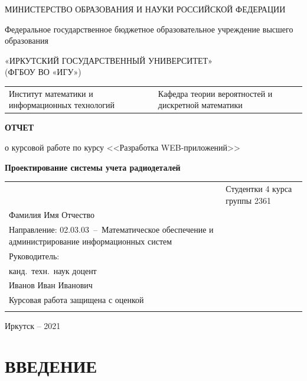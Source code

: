 \documentclass[12pt,final]{report}
\begin{document}
\thispagestyle{empty}
\begin{center}
МИНИСТЕРСТВО ОБРАЗОВАНИЯ И НАУКИ РОССИЙСКОЙ ФЕДЕРАЦИИ

Федеральное государственное бюджетное образовательное учреждение высшего образования

«ИРКУТСКИЙ  ГОСУДАРСТВЕННЫЙ УНИВЕРСИТЕТ»\\
(ФГБОУ ВО «ИГУ»)
\end{center}
\vfill %

\noindent\begin{tabularx}{\textwidth} {
  >{\raggedright\arraybackslash}X
  >{\raggedright\arraybackslash}X }
Институт математики и информационных технологий
&
Кафедра теории вероятностей и дискретной математики
\end{tabularx}

\vfill
\begin{center}
  \textbf{ОТЧЕТ}
\vspace{1em}

о курсовой работе по курсу <<Разработка WEB-приложений>>

{\bf Проектирование системы учета радиодеталей}

\end{center}
\vfill

\noindent\begin{tabularx}{\textwidth} {
  >{\raggedright\arraybackslash}X
  >{\raggedright}X }
&

Студентки 4 курса группы 2361\\
Фамилия Имя Отчество\\
Направление\;: 02.03.03~--~Математическое обеспечение и администрирование информационных систем\\[2em]

Руководитель:\\
канд.~техн.~наук доцент\\
Иванов Иван Иванович\\[2em]

Курсовая работа защищена с оценкой\\[1em] \underline{\hspace{3cm}}
\end{tabularx}
\vfill
\begin{center}
  Иркутск -- 2021
\end{center}
\clearpage

\tableofcontents

\chapter*{ВВЕДЕНИЕ}
\label{chap:intro}
\end{document}
